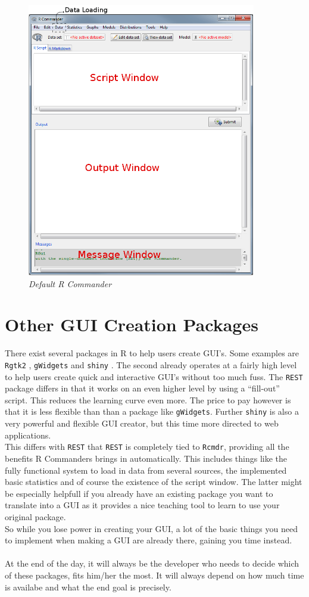 \documentclass[a4paper]{article}\usepackage[]{graphicx}\usepackage[]{color}
\begin{document}
\begin{figure}[H]
\centering
\includegraphics[width=10cm]{figures/rcmdrwindow.png}
\caption{{\it Default R Commander}\label{rcmdrwindow}}
\end{figure}


\section{Other GUI Creation Packages}
There exist several packages in R to help users create GUI's. Some examples are
\verb|Rgtk2| \citep{Lawrence2014}, \verb|gWidgets| \citep{Verzani2014} and
\verb|shiny| \citep{Chang2015}.
The second already operates at a fairly high level to help users
create quick and interactive GUI's without too much fuss. The \verb|REST|
package differs in that it works on an even higher level by using a
``fill-out'' script. This reduces the learning curve even more. The
price to pay however is that it is less flexible than than a package like
\verb|gWidgets|. Further \verb|shiny| is also a very powerful and flexible GUI
creator, but this time more directed to web applications.\\
This differs with \verb|REST| that \verb|REST| is completely tied to
\verb|Rcmdr|, providing all the benefits R Commanders brings in automatically.
This includes things like the fully functional system to load in data from several sources,
the implemented basic statistics and of course the existence of the script
window. The latter might be especially helpfull if you already have an existing
package you want to translate into a GUI as it provides a nice teaching tool to
learn to use your original package.\\
So while you lose power in creating your GUI, a lot of the basic things you
need to implement when making a GUI are already there, gaining you time instead.
\\ \\
At the end of the day, it will always be the developer who needs to decide 
which of these packages, fits him/her the most. It will always depend on how much time
is availabe and what the end goal is precisely.
\end{document}
